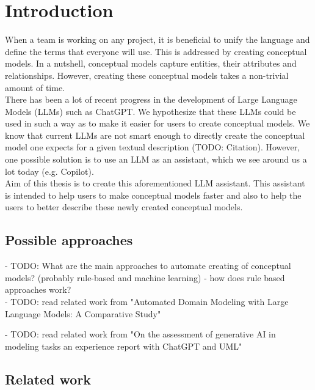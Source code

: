 \chapter*{Introduction}

When a team is working on any project, it is beneficial to unify the language and define the terms 
that everyone will use. This is addressed by creating conceptual models. In a nutshell, conceptual 
models capture entities, their attributes and relationships. However, creating these conceptual 
models takes a non-trivial amount of time. \\

There has been a lot of recent progress in the development of Large Language Models (LLMs) such 
as ChatGPT. We hypothesize that these LLMs could be used in such a way as to make it easier for 
users to create conceptual models. We know that current LLMs are not smart enough to directly 
create the conceptual model one expects for a given textual description (TODO: Citation). However, one possible solution is to use an LLM as an assistant, which we see around us a lot today (e.g. Copilot). \\


Aim of this thesis is to create this aforementioned LLM assistant. This assistant is intended to help users to make conceptual models faster and also to help the users to better describe these newly created conceptual models. \\


\section*{Possible approaches}

- TODO: What are the main approaches to automate creating of conceptual models? (probably rule-based and machine learning)
- how does rule based approaches work? \\

- TODO: read related work from "Automated Domain Modeling with Large Language Models: A Comparative Study"


- TODO: read related work from "On the assessment of generative AI in modeling tasks an experience report with ChatGPT and UML"


\section*{Related work}

